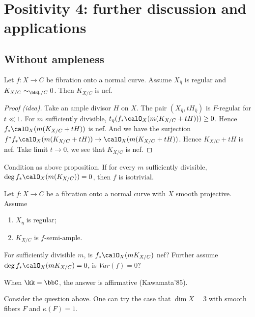 \section{Positivity 4: further discussion and applications}

\subsection{Without ampleness}

\begin{proposition}
	Let $f: X \to C$ be fibration onto a normal curve.
	Assume $X_{\overline{\eta}}$ is regular and $K_{X/C} \sim_{\bbQ, / C} 0$.
	Then $K_{X/C}$ is nef.
\end{proposition}
\begin{proof}[Proof (idea)]
	Take an ample divisor $H$ on $X$.
	The pair $(X_{\overline{\eta}},tH_{\overline{\eta}})$ is $F$-regular for $t \ll 1$.
	For $m$ sufficiently divisible, $t_\eta (f_* \calO_X(m(K_{X/C} + tH))) \geq 0$.
	Hence $f_* \calO_X(m(K_{X/C} + tH))$ is nef.
	And we have the surjection $f^* f_* \calO_X(m(K_{X/C} + tH)) \to \calO_X(m(K_{X/C} + tH))$.
	Hence $K_{X/C} + tH$ is nef.
	Take limit $t \to 0$, we see that $K_{X/C}$ is nef.
\end{proof}

\begin{theorem}[Ejiri 23]
	Condition as above proposition.
	If for every $m$ sufficiently divisible, $\deg f_* \calO_X(m(K_{X/C})) = 0$, then $f$ is isotrivial.
\end{theorem}

\begin{question}
	Let $f: X \to C$ be a fibration onto a normal curve with $X$ smooth projective.
	Assume
	\begin{enumerate}
		\item $X_{\overline{\eta}}$ is regular;
		\item $K_{X/C}$ is $f$-semi-ample.
	\end{enumerate}
	For sufficiently divisible $m$, is $f_* \calO_X(mK_{X/C})$ nef?
	Further assume $\deg f_* \calO_X(mK_{X/C}) = 0$, is $Var(f) = 0$?
\end{question}

\begin{remark}
	When $\kk = \bbC$, the answer is affirmative (Kawamata'85).
\end{remark}

Consider the question above.
One can try the case that $\dim X = 3$ with smooth fibers $F$ and $\kappa(F) = 1$.



